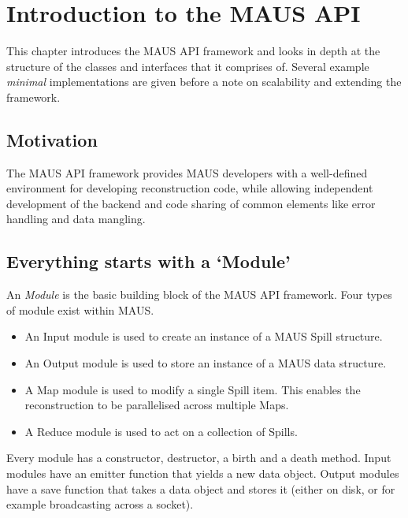 


\chapter{Introduction to the MAUS API}
\label{chapter:api}
This chapter introduces the MAUS API framework and looks in depth at the
structure of the classes and interfaces that it comprises of. Several example
\emph{minimal} implementations are given before a note on scalability and
extending the framework.

\section{Motivation}
The MAUS API framework provides MAUS developers with a well-defined environment
for developing reconstruction code, while allowing independent development of
the backend and code sharing of common elements like error handling and data
mangling.

\section{Everything starts with a `Module'}
An \emph{Module} is the basic building block of the MAUS API framework. Four
types of module exist within MAUS.

\begin{itemize}
\item An Input module is used to create an instance of a MAUS Spill structure.
\item An Output module is used to store an instance of a MAUS data structure.
\item A Map module is used to modify a single Spill item. This enables the
reconstruction to be parallelised across multiple Maps.
\item A Reduce module is used to act on a collection of Spills.
\end{itemize}

Every module has a constructor, destructor, a birth and a death method. Input
modules have an emitter function that yields a new data object. Output modules 
have a save function that takes a data object and stores it (either on disk, or
for example broadcasting across a socket).

